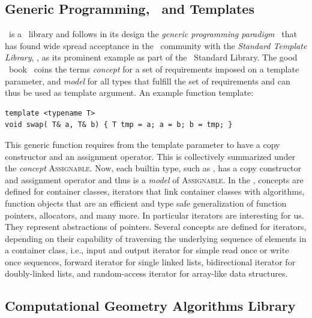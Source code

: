 \subsection{Generic Programming, \CC\ and Templates}

\cgal\ is a \CC\ library and follows in its design the \emph{generic
programming paradigm\/}~\cite{cgal:ms-aogl-94} %
that has found wide spread acceptance in the \CC\ community
with the \emph{Standard Template Library}, \stl, as its prominent
example as part of the \CC\ Standard Library. The good \stl\ 
book~\cite{cgal:a-gps-98} coins the terms
\emph{concept\/} for a set of requirements imposed on a template
parameter, and \emph{model\/} for all types that fulfill the set of
requirements and can thus be used as template argument. An example
function template:
\begin{lstlisting}
template <typename T>
void swap( T& a, T& b) { T tmp = a; a = b; b = tmp; }
\end{lstlisting}%
This generic  function requires from the template
parameter  to have a copy constructor and an assignment
operator. This is collectively summarized under the \emph{concept\/}
\textsc{Assignable}. Now, each builtin type, such as \CodeFmt{double},
has a copy constructor and assignment operator and thus is a
\emph{model\/} of \textsc{Assignable}. In the \stl , concepts are
defined for container classes, iterators that link container classes
with algorithms, function objects that are an efficient and type safe
generalization of function pointers, allocators, and many more. In
particular iterators are interesting for us. They represent
abstractions of pointers. Several concepts are defined for iterators,
depending on their capability of traversing the underlying sequence of
elements in a container class, i.e., input and output iterator for
simple read once or write once sequences, forward iterator for single
linked lists, bidirectional iterator for doubly-linked lists, and
random-access iterator for array-like data structures. 

\subsection{Computational Geometry Algorithms Library}

